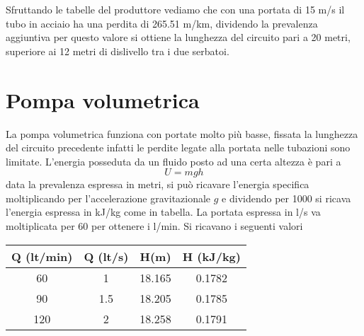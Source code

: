 \documentclass[a4paper,12pt]{article}
\begin{document}
Sfruttando le tabelle del produttore vediamo che con una portata di 15 m/s il tubo in acciaio ha una perdita di 265.51 m/km, dividendo la prevalenza aggiuntiva
per questo valore si ottiene la lunghezza del circuito pari a 20 metri, superiore ai 12 metri di dislivello tra i due serbatoi.

\section{Pompa volumetrica}
La pompa volumetrica funziona con portate molto più basse, fissata la lunghezza del circuito precedente infatti le perdite legate alla portata nelle tubazioni sono limitate.
L'energia posseduta da un fluido posto ad una certa altezza è pari a 
\begin{equation}
    U = mgh
\end{equation}
data la prevalenza espressa in metri, si può ricavare l'energia specifica moltiplicando per l'accelerazione gravitazionale $g$ e dividendo per 1000 si ricava 
l'energia espressa in kJ/kg come in tabella. La portata espressa in l/s va moltiplicata per 60 per ottenere i l/min.
Si ricavano i seguenti valori
\begin{center}
    \begin{tabular}{c|c|c|c}
        Q (lt/min)  &   Q (lt/s)&H(m)   &H (kJ/kg)  \\ \hline
        60          &   1       &18.165 &0.1782     \\ \hline
        90          &   1.5     &18.205 &0.1785     \\ \hline
        120         &   2       &18.258 &0.1791     \\ \hline
    \end{tabular}
\end{center}
\end{document}
